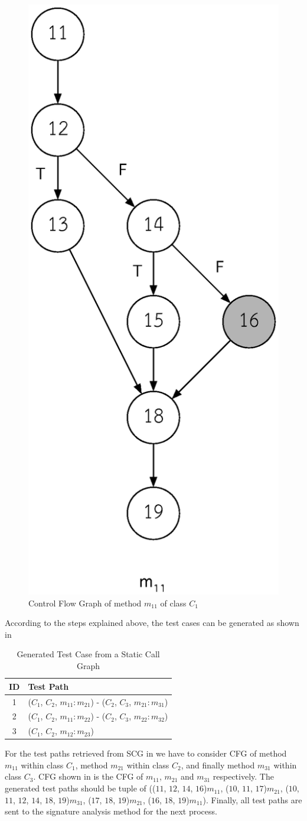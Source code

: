 \begin{figure}[hb!]
\centering
\includegraphics[width=0.4\linewidth]{figures/CFG-of-m11-in-c1}
\caption{Control Flow Graph of method $m_{11}$ of class $C_1$}
\label{fig:cfgOfMethod}
\end{figure}

According to the steps explained above, the test cases can be generated 
as shown in 

\begin{table}[!t]
\renewcommand{\arraystretch}{1.3}
\caption{Generated Test Case from a Static Call Graph}
\label{tab:generatedTestCase}
\centering
\begin{tabular}{cl}
\hline
ID & Test Path \\ \hline
1  & ($C_1$, $C_2$, $m_{11}:m_{21}$) - ($C_2$, $C_3$, $m_{21}:m_{31}$) \\ \hline
2  & ($C_1$, $C_2$, $m_{11}:m_{22}$) - ($C_2$, $C_3$, $m_{22}:m_{32}$) \\ \hline
3  & ($C_1$, $C_2$, $m_{12}:m_{23}$) \\ \hline
\hline
\end{tabular}
\end{table}

For the test paths retrieved from SCG in  we have to consider CFG 
of method $m_{11}$ within class $C_1$, method $m_{21}$ within class $C_2$, and finally 
method $m_{31}$ within class $C_3$. CFG shown in  is the CFG 
of $m_{11}$, $m_{21}$ and $m_{31}$ respectively. The generated test paths should be tuple of 
(($11$, $12$, $14$, $16$)$m_{11}$, ($10$, $11$, $17$)$m_{21}$, 
($10$, $11$, $12$, $14$, $18$, $19$)$m_{31}$, ($17$, $18$, $19$)$m_{21}$, ($16$, $18$, $19$)$m_{11}$). 
Finally, all test paths are sent to the signature analysis method for the next process.

